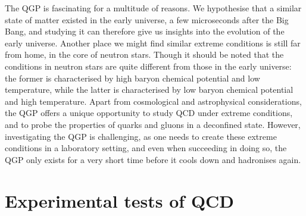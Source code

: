     The QGP is fascinating for a multitude of reasons. We hypothesise that a similar state of matter existed in the early universe, a few microseconds after the Big Bang, and studying it can therefore give us insights into the evolution of the early universe. Another place we might find similar extreme conditions is still far from home,  in the core of neutron stars. Though it should be noted that the conditions in neutron stars are quite different from those in the early universe: the former is characterised by high baryon chemical potential and low temperature, while the latter is characterised by low baryon chemical potential and high temperature.  Apart from cosmological and astrophysical considerations, the QGP offers a unique opportunity to study QCD under extreme conditions, and to probe the properties of quarks and gluons in a deconfined state. However, investigating the QGP is challenging, as one needs to create these extreme conditions in a laboratory setting, and even when succeeding in doing so, the QGP only exists for a very short time before it cools down and hadronises again.
    
     

\section{Experimental tests of QCD}
\label{sec:experimentalQCD}


